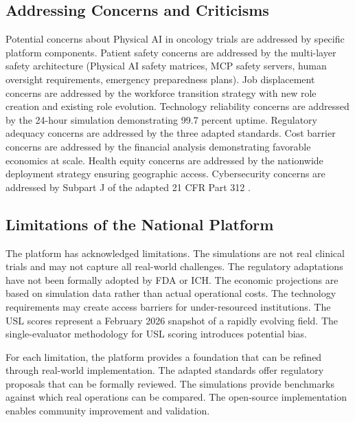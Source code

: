 \subsection{Addressing Concerns and Criticisms}
\label{subsec:discuss-concerns}

Potential concerns about Physical AI in oncology trials are addressed by
specific platform components. Patient safety concerns are addressed by the
multi-layer safety architecture (Physical AI safety matrices, MCP safety
servers, human oversight requirements, emergency preparedness plans). Job
displacement concerns are addressed by the workforce transition strategy with
new role creation and existing role evolution. Technology reliability concerns
are addressed by the 24-hour simulation demonstrating 99.7 percent uptime.
Regulatory adequacy concerns are addressed by the three adapted standards.
Cost barrier concerns are addressed by the financial analysis demonstrating
favorable economics at scale. Health equity concerns are addressed by the
nationwide deployment strategy ensuring geographic access. Cybersecurity
concerns are addressed by Subpart J of the adapted 21 CFR Part 312
\cite{cfr312-adapt}.

\subsection{Limitations of the National Platform}
\label{subsec:discuss-limitations}

The platform has acknowledged limitations. The simulations are not real clinical
trials and may not capture all real-world challenges. The regulatory adaptations
have not been formally adopted by FDA or ICH. The economic projections are based
on simulation data rather than actual operational costs. The technology
requirements may create access barriers for under-resourced institutions. The
USL scores represent a February 2026 snapshot of a rapidly evolving field. The
single-evaluator methodology for USL scoring introduces potential bias.

For each limitation, the platform provides a foundation that can be refined
through real-world implementation. The adapted standards offer regulatory
proposals that can be formally reviewed. The simulations provide benchmarks
against which real operations can be compared. The open-source implementation
enables community improvement and validation.

